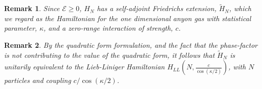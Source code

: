 \documentclass[a4paper,11pt]{article}
\newtheorem{remark}{Remark}
\numberwithin{equation}{section}
\begin{document}
		\begin{remark}
			 Since $ \mathcal{E}\geq0 $, $ H_N $ has a self-adjoint Friedrichs extension, $ \tilde{H}_N $, which we regard as the Hamiltonian for the one dimensional anyon gas with statistical parameter, $ \kappa $, and a zero-range interaction of strength, $ c $.
		\end{remark}
		\begin{remark}
			By the quadratic form formulation, and the fact that the phase-factor is not contributing to the value of the quadratic form, it follows that $ \tilde{H}_N $ is unitarily equivalent to the Lieb-Liniger Hamiltonian $ H_{LL}(N,\frac{c}{\cos(\kappa/2)}) $, with $ N $ particles and coupling $ c/\cos(\kappa/2) $.
		\end{remark}
	
\end{document}
